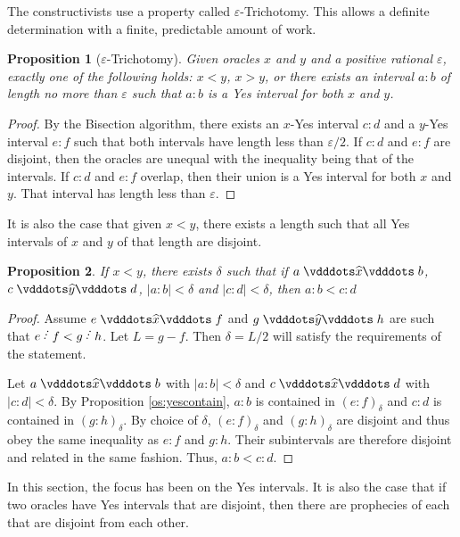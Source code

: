 \documentclass[12pt]{article}
\newtheorem{proposition}{Proposition}[section]
\begin{document}
The constructivists use a property called $\varepsilon$-Trichotomy. This allows a definite determination with a finite, predictable amount of work. 

\begin{proposition}[$\varepsilon$-Trichotomy]
    Given oracles $x$ and $y$ and a positive rational $\varepsilon$, exactly one of the following holds: $x<y$, $x>y$, or there exists an interval $a:b$ of length no more than $\varepsilon$ such that $a:b$ is a Yes interval for both $x$ and $y$.
\end{proposition}

\begin{proof}
    By the Bisection algorithm, there exists an $x$-Yes interval $c:d$ and a $y$-Yes interval $e:f$ such that both intervals have length less than $\varepsilon/2$. If $c:d$ and $e:f$ are disjoint, then the oracles are unequal with the inequality being that of the intervals. If $c:d$ and $e:f$ overlap, then their union is a Yes interval for both $x$ and $y$. That interval has length less than $\varepsilon$.
\end{proof}

It is also the case that given $x < y$, there exists a length such that all Yes intervals of $x$ and $y$ of that length are disjoint. 

\begin{proposition}
    If $ x< y$, there exists $\delta$ such that if $a \xora b$, $c \xora[y] d$, $|a:b| < \delta$ and $|c:d| < \delta$, then $a:b < c:d$
\end{proposition}

\begin{proof}
    Assume $e \xora f$ and $g \xora[y] h$ are such that $e\lte f < g \lte h$. Let $L = g-f$. Then $\delta = L/2$ will satisfy the requirements of the statement. 

    Let $a \xora b$ with $|a:b| < \delta$ and $c \xora d$ with $|c:d| < \delta$. By Proposition \ref{os:yescontain}, $a:b$ is contained in $(e:f)_\delta$ and $c:d$ is contained in $(g:h)_\delta$. By choice of $\delta$, $(e:f)_\delta$ and $(g:h)_\delta$ are disjoint and thus obey the same inequality as $e:f$ and $g:h$. Their subintervals are therefore disjoint and related in the same fashion. Thus, $a:b < c:d$. 
\end{proof}

In this section, the focus has been on the Yes intervals. It is also the case that if two oracles have Yes intervals that are disjoint, then there are prophecies of each that are disjoint from each other.
\end{document}
